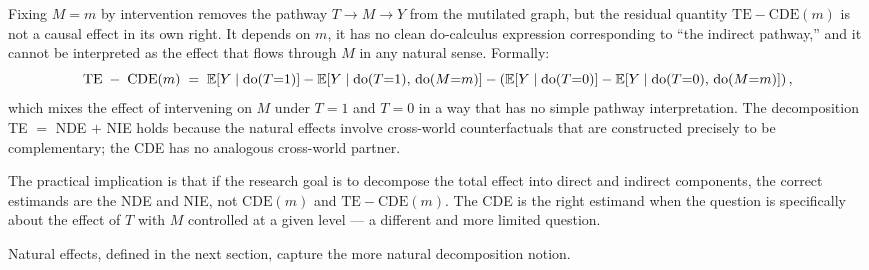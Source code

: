 \documentclass[master.tex]{subfiles}
\begin{document}
Fixing $M = m$ by intervention removes the pathway $T \to M \to Y$
from the mutilated graph, but the residual quantity
$\mathrm{TE} - \mathrm{CDE}(m)$ is not a causal effect in its own
right.  It depends on $m$, it has no clean do-calculus expression
corresponding to ``the indirect pathway,'' and it cannot be
interpreted as the effect that flows through $M$ in any natural
sense.  Formally:
\begin{equation}
  \mathrm{TE} \;-\; \mathrm{CDE}(m)
  \;=\;
  \mathbb{E}\!\left[Y \mid \mathrm{do}(T{=}1)\right]
  - \mathbb{E}\!\left[Y \mid \mathrm{do}(T{=}1),\,\mathrm{do}(M{=}m)\right]
  - \left(\mathbb{E}\!\left[Y \mid \mathrm{do}(T{=}0)\right]
  - \mathbb{E}\!\left[Y \mid \mathrm{do}(T{=}0),\,\mathrm{do}(M{=}m)\right]\right),
  \label{w8:eq:te-minus-cde}
\end{equation}
which mixes the effect of intervening on $M$ under $T=1$ and $T=0$ in
a way that has no simple pathway interpretation.  The decomposition
TE $=$ NDE $+$ NIE holds because the natural effects involve
cross-world counterfactuals that are constructed precisely to be
complementary; the CDE has no analogous cross-world partner.

\medskip\noindent The practical implication is that if the research
goal is to decompose the total effect into direct and indirect
components, the correct estimands are the NDE and NIE, not
$\mathrm{CDE}(m)$ and $\mathrm{TE} - \mathrm{CDE}(m)$.  The CDE is
the right estimand when the question is specifically about the effect
of $T$ with $M$ controlled at a given level --- a different and more
limited question.

Natural effects, defined in the next section, capture the more natural
decomposition notion.
\end{document}

